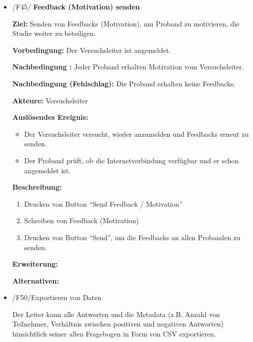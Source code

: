 \documentclass[a4paper]{scrreprt}
\begin{document}
\begin{itemize}
                \item /F45/ \textbf{Feedback (Motivation) senden}
                    \par \textbf{Ziel: }Senden von Feedbacks (Motivation), um Proband zu motivieren, die Studie weiter zu beteiligen.
                    \par \textbf{Vorbedingung: }Der Versuchsleiter ist angemeldet.
                    \par \textbf{Nachbedingung : }Jeder Proband erhalten Motivation vom Versuchsleiter.
                    \par \textbf{Nachbedingung (Fehlschlag): }Die Proband erhalten keine Feedbacks.
                    \par \textbf{Akteure: }Versuchsleiter
                    \par \textbf{Auslösendes Ereignis: }
                        \begin{itemize}
                            \item Der Versuchsleiter versucht, wieder anzumelden und Feedbacks erneut zu senden.
                            \item Der Proband pr\"uft, ob die Internetverbindung verf\"ugbar und er schon angemeldet ist.
                        \end{itemize}
                    \par \textbf{Beschreibung: }
                        \begin{enumerate}
                            \item Drucken von Button ``Send Feedback / Motivation''
                            \item Schreiben von Feedback (Motivation)
                            \item Drucken von Button ``Send'', um die Feedbacks an allen Probanden zu senden.
                        \end{enumerate}
                    \par \textbf{Erweiterung: }
                    \par \textbf{Alternativen: }



	            \item /F50/Exportieren von Daten
		         	\par Der Leiter kann alle Antworten und die Metadata (z.B. Anzahl von Teilnehmer, Verhältnis zwischen positiven und negativen Antworten) hinsichtlich seiner allen Fragebogen in Form von CSV exportieren.

			\end{itemize}
\end{document}
